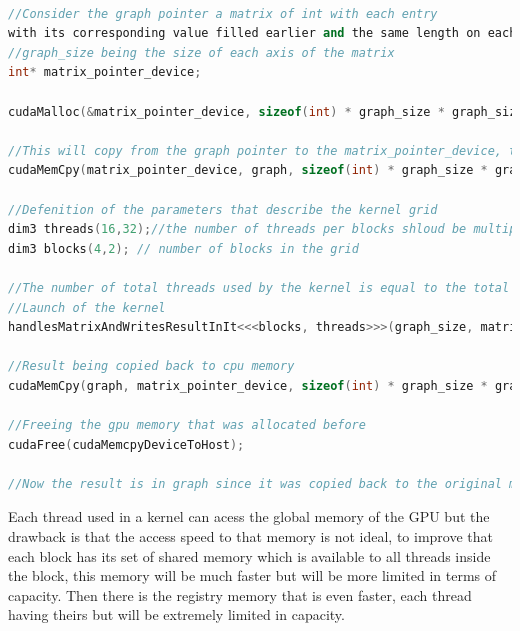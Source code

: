 \documentclass[runningheads]{llncs}
\begin{document}
\begin{lstlisting}[language=C++, caption=Cuda example]

//Consider the graph pointer a matrix of int with each entry 
with its corresponding value filled earlier and the same length on each axis
//graph_size being the size of each axis of the matrix
int* matrix_pointer_device;

cudaMalloc(&matrix_pointer_device, sizeof(int) * graph_size * graph_size):

//This will copy from the graph pointer to the matrix_pointer_device, that is copying the matrix in the cpu memory to the pointer with memory allocated in the gpu memory
cudaMemCpy(matrix_pointer_device, graph, sizeof(int) * graph_size * graph_size, cudaMemcpyHostToDevice);

//Defenition of the parameters that describe the kernel grid
dim3 threads(16,32);//the number of threads per blocks shloud be multiple of 32
dim3 blocks(4,2); // number of blocks in the grid

//The number of total threads used by the kernel is equal to the total number of threads per block multiplied by the number of blocks used by the kernel.
//Launch of the kernel
handlesMatrixAndWritesResultInIt<<<blocks, threads>>>(graph_size, matrix_pointer_device);

//Result being copied back to cpu memory
cudaMemCpy(graph, matrix_pointer_device, sizeof(int) * graph_size * graph_size, cudaMemcpyDeviceToHost);

//Freeing the gpu memory that was allocated before
cudaFree(cudaMemcpyDeviceToHost);

//Now the result is in graph since it was copied back to the original matrix.

\end{lstlisting}





Each thread used in a kernel can acess the global memory of the GPU but the drawback is that the access speed to that memory is not ideal, to improve that each block has its set of shared memory which is available to all threads inside the block, this memory will be much faster but will be more limited in terms of capacity. Then there is the registry memory that is even faster, each thread having theirs but will be extremely limited in capacity.
\end{document}
